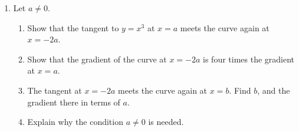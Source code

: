 \documentclass[11pt,a4paper]{article}
\begin{document}
\begin{enumerate}
\item Let $a\neq0$.
\begin{enumerate}
\item[(a)] Show that the tangent to $y=x^3$ at $x=a$ meets the curve again at $x=-2a$.
\item[(b)] Show that the gradient of the curve at $x=-2a$ is four times the gradient at $x=a$.
\item[(c)] The tangent at $x=-2a$ meets the curve again at $x=b$. Find $b$, and the gradient there in terms of $a$.
\item[(d)] Explain why the condition $a\neq0$ is needed.
\end{enumerate}

\end{enumerate}

\end{document}

